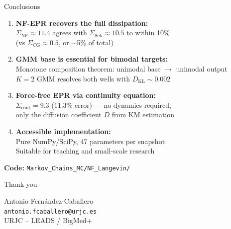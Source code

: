 \documentclass[aspectratio=169,11pt]{beamer}
\begin{document}
\begin{frame}{Conclusions}

\begin{enumerate}
    \item \textbf{NF-EPR recovers the full dissipation:}\\
    $\Sigma_{\mathrm{NF}} \approx 11.4$ agrees with $\Sigma_{\mathrm{Sek}} \approx 10.5$ to within 10\%\\
    (vs $\Sigma_{\mathrm{CG}} \approx 0.5$, or $\sim$5\% of total)

    \vspace{0.4em}
    \item \textbf{GMM base is essential for bimodal targets:}\\
    Monotone composition theorem: unimodal base $\to$ unimodal output\\
    $K=2$ GMM resolves both wells with $D_{\mathrm{KL}} \sim 0.002$

    \vspace{0.4em}
    \item \textbf{Force-free EPR via continuity equation:}\\
    $\Sigma_{\mathrm{cont}} = 9.3$ ($11.3\%$ error) --- no dynamics required,\\
    only the diffusion coefficient $D$ from KM estimation

    \vspace{0.4em}
    \item \textbf{Accessible implementation:}\\
    Pure NumPy/SciPy, 47 parameters per snapshot\\
    Suitable for teaching and small-scale research
\end{enumerate}

\vspace{0.3em}
\centering
\textbf{Code:} \texttt{Markov\_Chains\_MC/NF\_Langevin/}

\end{frame}


\begin{frame}{}
\centering
\vspace{2cm}
{\Huge Thank you}

\vspace{1.5cm}
{\large Antonio Fern\'{a}ndez-Caballero}\\[0.3em]
{\normalsize \texttt{antonio.fcaballero@urjc.es}}\\[0.3em]
{\normalsize URJC -- LEADS / BigMed+}
\end{frame}
\end{document}
